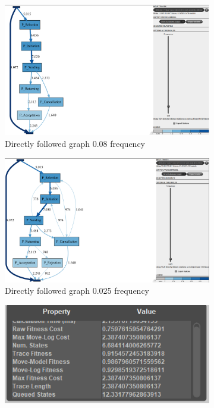 \begin{figure}[h]
\centering
\begin{subfigure}{.49\textwidth}
  \centering
  \includegraphics[width=\linewidth]{P_DirectlyFollowedFreq0-08.PNG}
  \caption{Directly followed graph 0.08 frequency}
  \label{fig:P_DFG0-08}
\end{subfigure}
\begin{subfigure}{.49\textwidth}
  \centering
  \includegraphics[width=\linewidth]{P_DirectlyFollowedFreq0-025.PNG}
  \caption{Directly followed graph 0.025 frequency}
  \label{fig:P_DFG0-025}
\end{subfigure}%
\begin{subfigure}{.5\textwidth}
  \centering
  \includegraphics[width=\linewidth]{P_Conformance0-08.PNG}

\end{subfigure}
\end{figure}
